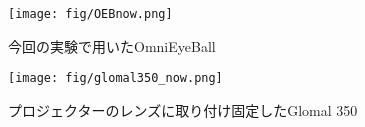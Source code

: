   \begin{figure}[tbp]
    \centering
    \texttt{[image: fig/OEBnow.png]}
    \caption{今回の実験で用いたOmniEyeBall}
  \end{figure}

  \begin{figure}[p]
    \centering
    \texttt{[image: fig/glomal350\_now.png]}
    \caption{プロジェクターのレンズに取り付け固定したGlomal 350}
  \end{figure}
